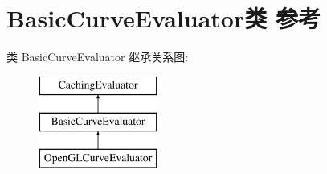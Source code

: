 \hypertarget{class_basic_curve_evaluator}{}\section{Basic\+Curve\+Evaluator类 参考}
\label{class_basic_curve_evaluator}
类 Basic\+Curve\+Evaluator 继承关系图\+:\begin{figure}[H]
\begin{center}
\leavevmode
\includegraphics[height=3.000000cm]{class_basic_curve_evaluator}
\end{center}
\end{figure}
